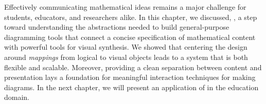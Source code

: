 Effectively communicating mathematical ideas remains a major challenge for students, educators, and researchers alike. In this chapter, we discussed, \Penrose{}, a step toward understanding the abstractions needed to build general-purpose diagramming tools that connect a concise specification of mathematical content with powerful tools for visual synthesis. We showed that centering the design around \emph{mappings} from logical to visual objects leads to a system that is both flexible and scalable. Moreover, providing a clean separation between content and presentation lays a foundation for meaningful interaction techniques for making diagrams. In the next chapter, we will present an application of \Penrose{} in the education domain.



 







